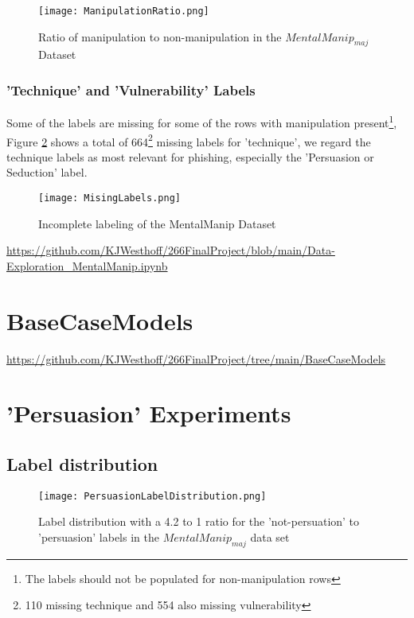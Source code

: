 \documentclass[
	letterpaper, %
	12pt, %
	unnumberedsections, %
	twoside, %
]{LTJournalArticle}
\begin{document}
\begin{appendices}
	\begin{figure}[!htp] %
		\centering
		\texttt{[image: ManipulationRatio.png]}
		\caption{Ratio of manipulation to non-manipulation in the $MentalManip_{maj}$ Dataset}
		\label{fig:ManipulationRatio}
	\end{figure}

	\subsubsection{'Technique' and 'Vulnerability' Labels}
	Some of the labels are missing for some of the rows with manipulation present\footnote{The labels should not be populated for non-manipulation rows}, Figure \ref{fig:MissingLabels} shows a total of 664\footnote{110 missing technique and 554 also missing vulnerability} missing labels for 'technique', we regard the technique labels as most relevant for phishing, especially the 'Persuasion or Seduction' label.
	\begin{figure}[!htp] %
		\centering
		\texttt{[image: MisingLabels.png]}
		\caption{Incomplete labeling of the MentalManip Dataset}
		\label{fig:MissingLabels}
	\end{figure}







	\url{https://github.com/KJWesthoff/266FinalProject/blob/main/Data-Exploration_MentalManip.ipynb}

	\section{BaseCaseModels}\label{appendix:BaseCaseModels}
	\url{https://github.com/KJWesthoff/266FinalProject/tree/main/BaseCaseModels}

	\section{'Persuasion' Experiments}\label{appendix:PersuasionExperiments}
	\subsection{Label distribution}\label{appendix:PersuasionLabelDistribution}
	\begin{figure}[!htp] %
		\centering
		\texttt{[image: PersuasionLabelDistribution.png]}
		\caption{Label distribution with a 4.2 to 1 ratio for the 'not-persuation' to  'persuasion' labels in the $MentalManip_{maj}$ data set}
		\label{fig:PersuasionLabelDistribution}
	\end{figure}



\end{appendices}
\end{document}
